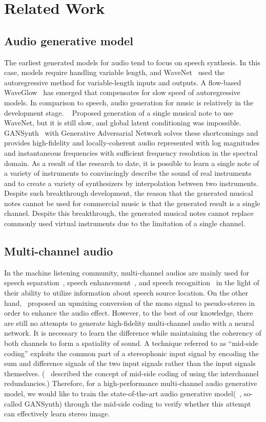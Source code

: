 \section{Related Work}
\label{sec:related_work}
\subsection{Audio generative model}
The earliest generated models for audio tend to focus on speech synthesis. In this case, models require handling variable length, and WaveNet~\cite{wavenet} used the autoregressive method for variable-length inputs and outputs. A flow-based WaveGlow~\cite{waveglow} has emerged that compensates for slow speed of autoregressive models. In comparison to speech, audio generation for music is relatively in the development stage. ~\cite{nsynth} Proposed generation of a single musical note to use WaveNet, but it is still slow, and global latent conditioning was impossible. GANSynth~\cite{gansynth} with Generative Adversarial Network solves these shortcomings and provides high-fidelity and locally-coherent audio represented with log magnitudes and instantaneous frequencies with sufficient frequency resolution in the spectral domain. As a result of the research to date, it is possible to learn a single note of a variety of instruments to convincingly describe the sound of real instruments and to create a variety of synthesizers by interpolation between two instruments. Despite such breakthrough development, the reason that the generated musical notes cannot be used for commercial music is that the generated result is a single channel. Despite this breakthrough, the generated musical notes cannot replace commonly used virtual instruments due to the limitation of a single channel.

\subsection{Multi-channel audio}

In the machine listening community, multi-channel audios are mainly used for speech separation~\cite{multi_ch_sourcesep}, speech enhancement~\cite{speech_enh}, and speech recognition~\cite{speech_recog} in the light of their ability to utilize information about speech source location. On the other hand,~\cite{upmix} proposed an upmixing conversion of the mono signal to pseudo-stereo in order to enhance the audio effect. However, to the best of our knowledge, there are still no attempts to generate high-fidelity multi-channel audio with a neural network. It is necessary to learn the difference while maintaining the coherency of both channels to form a spatiality of sound. A technique referred to as “mid-side coding” exploits the common part of a stereophonic input signal by encoding the sum and difference signals of the two input signals rather than the input signals themselves. (~\cite{mscoding} described the concept of mid-side coding of using the interchannel redundancies.) Therefore, for a high-performance multi-channel audio generative model, we would like to train the state-of-the-art audio generative model(~\cite{gansynth}, so-called GANSynth) through the mid-side coding to verify whether this attempt can effectively learn stereo image.